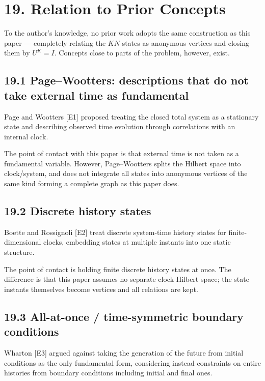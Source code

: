 \documentclass[
  a4paper,
]{article}
\begin{document}
\section{19. Relation to Prior
Concepts}\label{relation-to-prior-concepts}

To the author's knowledge, no prior work adopts the same construction as
this paper --- completely relating the \(KN\) states as anonymous
vertices and closing them by \(U^K=I\). Concepts close to parts of the
problem, however, exist.

\subsection{19.1 Page--Wootters: descriptions that do not take external
time as
fundamental}\label{pagewootters-descriptions-that-do-not-take-external-time-as-fundamental}

Page and Wootters {[}E1{]} proposed treating the closed total system as
a stationary state and describing observed time evolution through
correlations with an internal clock.

The point of contact with this paper is that external time is not taken
as a fundamental variable. However, Page--Wootters splits the Hilbert
space into clock/system, and does not integrate all states into
anonymous vertices of the same kind forming a complete graph as this
paper does.

\subsection{19.2 Discrete history states}\label{discrete-history-states}

Boette and Rossignoli {[}E2{]} treat discrete system-time history states
for finite-dimensional clocks, embedding states at multiple instants
into one static structure.

The point of contact is holding finite discrete history states at once.
The difference is that this paper assumes no separate clock Hilbert
space; the state instants themselves become vertices and all relations
are kept.

\subsection{19.3 All-at-once / time-symmetric boundary
conditions}\label{all-at-once-time-symmetric-boundary-conditions}

Wharton {[}E3{]} argued against taking the generation of the future from
initial conditions as the only fundamental form, considering instead
constraints on entire histories from boundary conditions including
initial and final ones.
\end{document}
